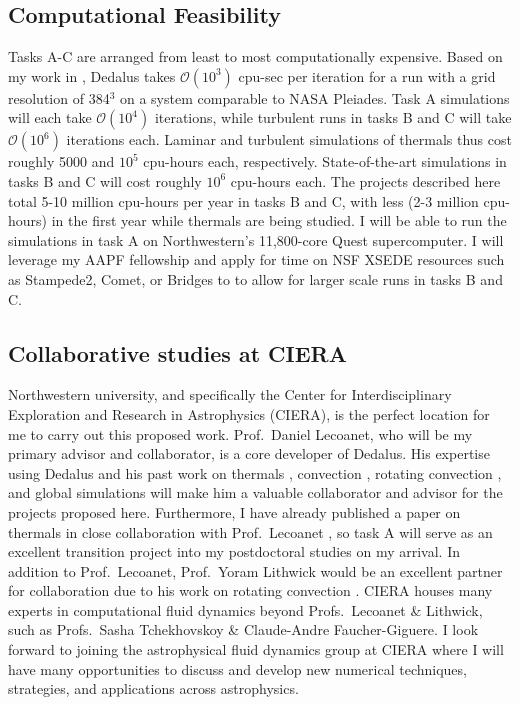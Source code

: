 \documentclass[11pt, preprint]{aastex}
\begin{document}
\vspace{-0.8cm}
\subsection*{Computational Feasibility}
\vspace{-0.3cm}
\label{sct:feasibility}
Tasks A-C are arranged from least to most computationally expensive.
Based on my work in \citet{anders&brown2017, anders&all2018, anders&all2019}, Dedalus takes $\mathcal{O}(10^3)$ cpu-sec per iteration for a run with a grid resolution of 384$^3$ on a system comparable to NASA Pleiades.
Task A simulations will each take $\mathcal{O}(10^4)$ iterations, while turbulent runs in tasks B and C will take $\mathcal{O}(10^6)$ iterations each.
Laminar and turbulent simulations of thermals thus cost roughly 5000 and $10^5$ cpu-hours each, respectively.
State-of-the-art simulations in tasks B and C will cost roughly $10^6$ cpu-hours each.
The projects described here total 5-10 million cpu-hours per year in tasks B and C, with less (2-3 million cpu-hours) in the first year while thermals are being studied.
I will be able to run the simulations in task A on Northwestern's 11,800-core Quest supercomputer.
I will leverage my AAPF fellowship and apply for time on NSF XSEDE resources such as Stampede2, Comet, or Bridges to to allow for larger scale runs in tasks B and C. 

\vspace{-0.8cm}
\subsection*{Collaborative studies at CIERA}
\vspace{-0.3cm}
\label{sct:ciera}
Northwestern university, and specifically the Center for Interdisciplinary Exploration and Research in Astrophysics (CIERA), is the perfect location for me to carry out this proposed work.
Prof.~Daniel Lecoanet, who will be my primary advisor and collaborator, is a core developer of Dedalus.
His expertise using Dedalus and his past work on thermals \citep{lecoanet&jeevanjee2019, tarshis&all2018}, convection \citep{lecoanet&quataert2013, lecoanet&all2014, couston&all2017}, rotating convection \citep{couston&all2019}, and global simulations \citep{lecoanet&all2019} will make him a valuable collaborator and advisor for the projects proposed here.
Furthermore, I have already published a paper on thermals in close collaboration with Prof.~Lecoanet \citep{andersLB2019}, so task A will serve as an excellent transition project into my postdoctoral studies on my arrival.
In addition to Prof.~Lecoanet, Prof.~Yoram Lithwick would be an excellent partner for collaboration due to his work on rotating convection \citep[e.g.,][]{BDLithwick2014}.
CIERA houses many experts in computational fluid dynamics beyond Profs.~Lecoanet \& Lithwick, such as Profs.~Sasha Tchekhovskoy \& Claude-Andre Faucher-Giguere.
I look forward to joining the astrophysical fluid dynamics group at CIERA where I will have many opportunities to discuss and develop new numerical techniques, strategies, and applications across astrophysics.
\end{document}

